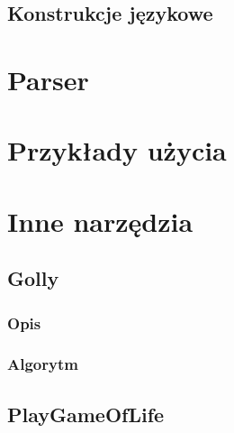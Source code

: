 \documentclass[declaration,shortabstract, inz]{iithesis}
\theoremstyle{definition} \newtheorem{definition}{Definicja}[]
\theoremstyle{plain} \newtheorem{remark}[definition]{Obserwacja}
\theoremstyle{plain} \newtheorem{theorem}[definition]{Twierdzenie}
\theoremstyle{plain} \newtheorem{example}{Przykład}[definition]
\theoremstyle{plain} \newtheorem{lemma}[definition]{Lemat}
\begin{document}
\section{Konstrukcje językowe}

\chapter{Parser}

\chapter{Przykłady użycia}
\chapter{Inne narzędzia}
\section{Golly}
\subsection{Opis}
\subsection{Algorytm}
\section{PlayGameOfLife}



\end{document}
